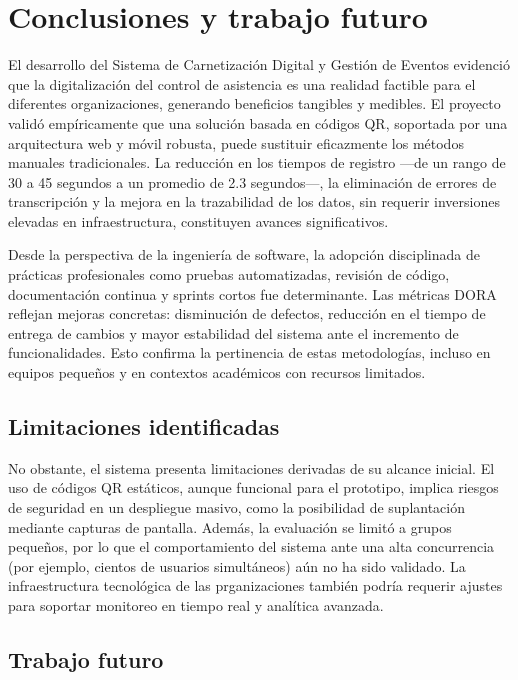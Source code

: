 \section{Conclusiones y trabajo futuro}

El desarrollo del Sistema de Carnetización Digital y Gestión de Eventos evidenció que la digitalización del control de asistencia es una realidad factible para el diferentes organizaciones, generando beneficios tangibles y medibles. El proyecto validó empíricamente que una solución basada en códigos QR, soportada por una arquitectura web y móvil robusta, puede sustituir eficazmente los métodos manuales tradicionales. La reducción en los tiempos de registro —de un rango de 30 a 45 segundos a un promedio de 2.3 segundos—, la eliminación de errores de transcripción y la mejora en la trazabilidad de los datos, sin requerir inversiones elevadas en infraestructura, constituyen avances significativos.

Desde la perspectiva de la ingeniería de software, la adopción disciplinada de prácticas profesionales como pruebas automatizadas, revisión de código, documentación continua y sprints cortos fue determinante. Las métricas DORA reflejan mejoras concretas: disminución de defectos, reducción en el tiempo de entrega de cambios y mayor estabilidad del sistema ante el incremento de funcionalidades. Esto confirma la pertinencia de estas metodologías, incluso en equipos pequeños y en contextos académicos con recursos limitados.

\subsection{Limitaciones identificadas}

No obstante, el sistema presenta limitaciones derivadas de su alcance inicial. El uso de códigos QR estáticos, aunque funcional para el prototipo, implica riesgos de seguridad en un despliegue masivo, como la posibilidad de suplantación mediante capturas de pantalla. Además, la evaluación se limitó a grupos pequeños, por lo que el comportamiento del sistema ante una alta concurrencia (por ejemplo, cientos de usuarios simultáneos) aún no ha sido validado. La infraestructura tecnológica de las prganizaciones también podría requerir ajustes para soportar monitoreo en tiempo real y analítica avanzada.

\subsection{Trabajo futuro}

